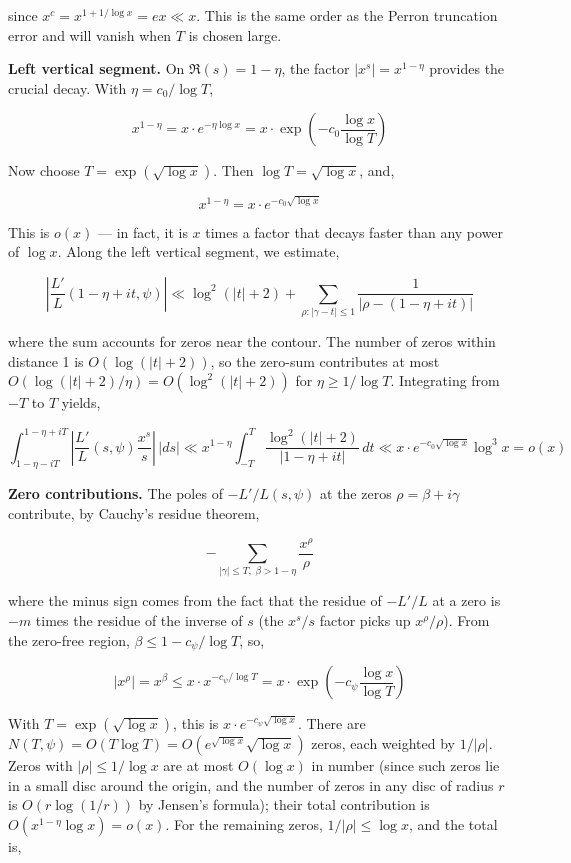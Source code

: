 \documentclass[12pt,a4paper]{article}
\begin{document}
since $x^c = x^{1+1/\log x} = ex \ll x$. This is the same order as the Perron truncation error and will vanish when $T$ is chosen large.

\textbf{Left vertical segment.} On $\Re(s) = 1-\eta$, the factor $|x^s| = x^{1-\eta}$ provides the crucial decay. With $\eta = c_0/\log T$,

\[
x^{1-\eta} = x \cdot e^{-\eta \log x} = x \cdot \exp\!\left(-c_0 \frac{\log x}{\log T}\right)
\]

Now choose $T = \exp(\sqrt{\log x})$. Then $\log T = \sqrt{\log x}$, and,

\[
x^{1-\eta} = x \cdot e^{-c_0 \sqrt{\log x}}
\]

This is $o(x)$ --- in fact, it is $x$ times a factor that decays faster than any power of $\log x$. Along the left vertical segment, we estimate,

\[
\left| \frac{L'}{L}(1-\eta+it, \psi) \right| \ll \log^2(|t|+2) + \sum_{\rho: |\gamma-t| \leq 1} \frac{1}{|\rho - (1-\eta+it)|}
\]

where the sum accounts for zeros near the contour. The number of zeros within distance 1 is $O(\log(|t|+2))$, so the zero-sum contributes at most $O(\log(|t|+2)/\eta) = O(\log^2(|t|+2))$ for $\eta \geq 1/\log T$. Integrating from $-T$ to $T$ yields,

\[
\int_{1-\eta-iT}^{1-\eta+iT} \left| \frac{L'}{L}(s, \psi) \frac{x^s}{s} \right| \, |ds| \ll x^{1-\eta} \int_{-T}^T \frac{\log^2(|t|+2)}{|1-\eta+it|} \, dt \ll x \cdot e^{-c_0\sqrt{\log x}} \log^3 x = o(x)
\]

\textbf{Zero contributions.} The poles of $-L'/L(s, \psi)$ at the zeros $\rho = \beta + i\gamma$ contribute, by Cauchy's residue theorem,

\[
-\sum_{|\gamma| \leq T, \; \beta > 1-\eta} \frac{x^\rho}{\rho}
\]

where the minus sign comes from the fact that the residue of $-L'/L$ at a zero is $-m$ times the residue of the inverse of $s$ (the $x^s/s$ factor picks up $x^\rho/\rho$). From the zero-free region, $\beta \leq 1 - c_{\psi}/\log T$, so,

\[
|x^\rho| = x^\beta \leq x \cdot x^{-c_{\psi}/\log T} = x \cdot \exp\!\left(-c_{\psi} \frac{\log x}{\log T}\right)
\]

With $T = \exp(\sqrt{\log x})$, this is $x \cdot e^{-c_{\psi} \sqrt{\log x}}$. There are $N(T, \psi) = O(T \log T) = O(e^{\sqrt{\log x}} \sqrt{\log x})$ zeros, each weighted by $1/|\rho|$. Zeros with $|\rho| \leq 1/\log x$ are at most $O(\log x)$ in number (since such zeros lie in a small disc around the origin, and the number of zeros in any disc of radius $r$ is $O(r \log(1/r))$ by Jensen's formula); their total contribution is $O(x^{1-\eta} \log x) = o(x)$. For the remaining zeros, $1/|\rho| \leq \log x$, and the total is,
\end{document}
